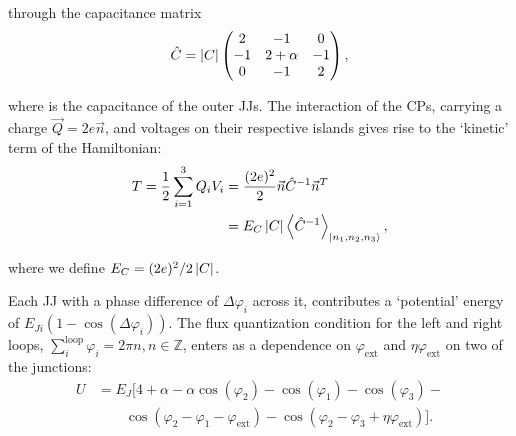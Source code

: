 \noindent through the capacitance matrix
\begin{equation}
  \label{eq:capac}
  \hat{C} = \left|C\right| \begin{pmatrix}
    2  &  -1  &  0\\
    -1  &  2  +  \alpha  &  -1\\
    0  &  -1  & 2
  \end{pmatrix},
\end{equation}

\noindent where   is  the capacitance of  the outer
JJs.   The  interaction  of  the  CPs,  carrying  a  charge
$  \vec{Q}=2e\vec{n} $,  and voltages  on their  respective
islands   gives  rise   to  the   `kinetic'  term   of  the
Hamiltonian:
\begin{equation}\label{eq:kinetic}
  \begin{aligned}
    T = \frac{1}{2}\sum_{i=1}^{3}Q_iV_i & =
    \frac{(2e)^2}{2}\vec{n}\hat{C}^{-1}\vec{n}^{T}\\
    & =  E_C \left|C\right| \left\langle \hat{C}^{-1} \right\rangle_{\Ket{n_{1},
        n_2, n_3}},
  \end{aligned}
\end{equation}

\noindent            where             we            define
$ E_{C}={(2e)^{2}}/{2 \left|C\right| } $.

Each  JJ with  a  phase  difference of  $\Delta\varphi_{i}$
across   it,   contributes    a   `potential'   energy   of
$ E_{Ji}\left(1 - \cos(\Delta\varphi_i)\right) $.  The flux
quantization  condition  for  the  left  and  right  loops,
$  \sum_{i}^{\text{loop}}   \varphi_i  =  2\pi  n,   n  \in
\mathbb{Z}$,     enters     as      a     dependence     on
$ \varphi_\text{ext}  $ and  $ \eta\varphi_\text{ext}  $ on
two of the junctions:
\begin{equation}\label{eq:potential}
  \begin{aligned}
    U & = E_J\big[4 + \alpha - \alpha\cos(\varphi_{2}) -\cos(\varphi_{1}) -\cos(\varphi_{3}) - \\
    &    \qquad    \cos(\varphi_{2}   -    \varphi_{1}    -
    \varphi_{\text{ext}}) -  \cos(\varphi_{2} - \varphi_{3}
    + \eta\varphi_{\text{ext}})\big].
  \end{aligned}
\end{equation}

